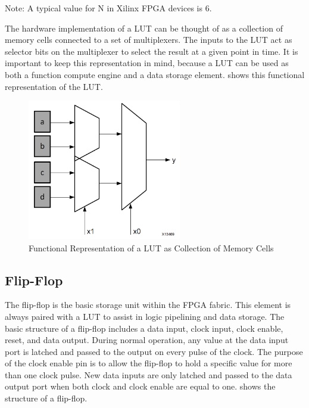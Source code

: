 \begin{highlight}
  Note: A typical value for N in Xilinx FPGA devices is 6.  
\end{highlight}

The hardware implementation of a LUT can be thought of as a collection of memory cells
connected to a set of multiplexers. The inputs to the LUT act as selector bits on the
multiplexer to select the result at a given point in time. It is important to keep this
representation in mind, because a LUT can be used as both a function compute engine and
a data storage element.  shows this functional representation of the LUT.

\begin{figure}[H]
  \begin{center}
      \includegraphics[width=0.6\textwidth]{images/LUT.png}
      \caption{Functional Representation of a LUT as Collection of Memory Cells}
      \label{LUT}
  \end{center}
\end{figure}

\clearpage

\subsection{Flip-Flop}

The flip-flop is the basic storage unit within the FPGA fabric. This element is always paired
with a LUT to assist in logic pipelining and data storage. The basic structure of a flip-flop
includes a data input, clock input, clock enable, reset, and data output. During normal
operation, any value at the data input port is latched and passed to the output on every
pulse of the clock. The purpose of the clock enable pin is to allow the flip-flop to hold a
specific value for more than one clock pulse. New data inputs are only latched and passed
to the data output port when both clock and clock enable are equal to one. 
shows the structure of a flip-flop.

